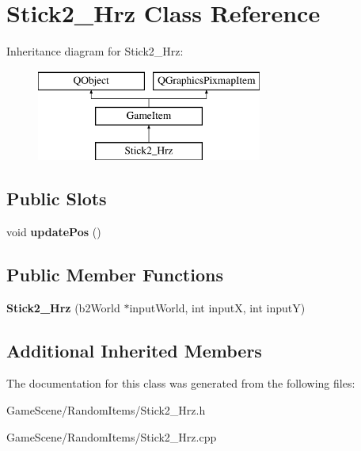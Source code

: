 \hypertarget{classStick2__Hrz}{}\section{Stick2\+\_\+\+Hrz Class Reference}
\label{classStick2__Hrz}
Inheritance diagram for Stick2\+\_\+\+Hrz\+:\begin{figure}[H]
\begin{center}
\leavevmode
\includegraphics[height=3.000000cm]{classStick2__Hrz}
\end{center}
\end{figure}
\subsection*{Public Slots}
\begin{DoxyCompactItemize}
\item 
void {\bfseries update\+Pos} ()\hypertarget{classStick2__Hrz_a541f2a3db96c9a07ace5a584aa38f291}{}\label{classStick2__Hrz_a541f2a3db96c9a07ace5a584aa38f291}

\end{DoxyCompactItemize}
\subsection*{Public Member Functions}
\begin{DoxyCompactItemize}
\item 
{\bfseries Stick2\+\_\+\+Hrz} (b2\+World $\ast$input\+World, int inputX, int inputY)\hypertarget{classStick2__Hrz_ab48265110578343eb9c7394caccda625}{}\label{classStick2__Hrz_ab48265110578343eb9c7394caccda625}

\end{DoxyCompactItemize}
\subsection*{Additional Inherited Members}


The documentation for this class was generated from the following files\+:\begin{DoxyCompactItemize}
\item 
Game\+Scene/\+Random\+Items/Stick2\+\_\+\+Hrz.\+h\item 
Game\+Scene/\+Random\+Items/Stick2\+\_\+\+Hrz.\+cpp\end{DoxyCompactItemize}
